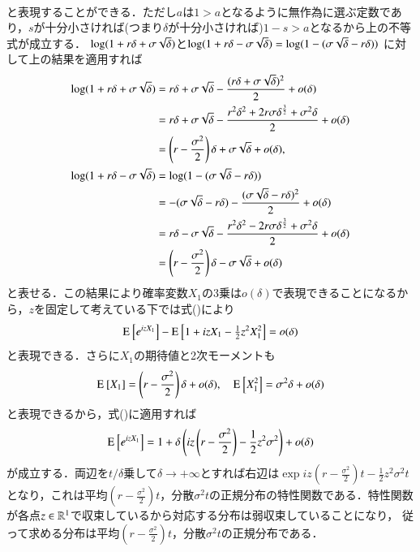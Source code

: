 \begin{description}
\begin{align}
		\end{align}
		と表現することができる．ただし$a$は$1 > a$となるように無作為に選ぶ定数であり，$s$が十分小さければ(つまり$\delta$が十分小さければ)$1 - s > a$となるから上の不等式が成立する．
		$\operatorname{log} (1 + r \delta + \sigma \sqrt{\delta})$と$\operatorname{log} (1 + r \delta - \sigma \sqrt{\delta}) = \operatorname{log} (1 - (\sigma \sqrt{\delta} - r \delta))$
		に対して上の結果を適用すれば
		\begin{align}
			\operatorname{log} (1 + r \delta + \sigma \sqrt{\delta}) &= r \delta + \sigma \sqrt{\delta} - \frac{(r \delta + \sigma \sqrt{\delta})^2}{2} + o(\delta) \\
				&= r \delta + \sigma \sqrt{\delta} - \frac{r^2 \delta^2 + 2r \sigma \delta^\frac{3}{2} + \sigma^2 \delta}{2} + o(\delta) \\
				&= \left(r - \frac{\sigma^2}{2}\right)\delta + \sigma \sqrt{\delta} + o(\delta), \\
			\operatorname{log} (1 + r \delta - \sigma \sqrt{\delta}) &= \operatorname{log} (1 - (\sigma \sqrt{\delta} - r \delta)) \\
				&= - (\sigma \sqrt{\delta} - r \delta) - \frac{(\sigma \sqrt{\delta} - r \delta)^2}{2} + o(\delta) \\
				&= r \delta - \sigma \sqrt{\delta} - \frac{r^2 \delta^2 - 2r \sigma \delta^\frac{3}{2} + \sigma^2 \delta}{2} + o(\delta) \\
				&= \left(r - \frac{\sigma^2}{2}\right)\delta - \sigma \sqrt{\delta} + o(\delta)
		\end{align}
		と表せる．この結果により確率変数$X_1$の3乗は$o(\delta)$で表現できることになるから，$z$を固定して考えている下では式()により
		\begin{align}
			\operatorname{E}_{}^{} \left[ e^{izX_1} \right] - \operatorname{E}_{}^{} \left[ 1 + izX_1 - \tfrac{1}{2}z^2X_1^2 \right] = o(\delta) \label{eq:finance_Q2_2}
		\end{align}
		と表現できる．さらに$X_1$の期待値と2次モーメントも
		\begin{align}
			\operatorname{E}_{}^{} \left[ X_1 \right] = \left(r - \frac{\sigma^2}{2}\right)\delta + o(\delta), \quad \operatorname{E}_{}^{} \left[ X_1^2 \right] = \sigma^2 \delta + o(\delta)
		\end{align}
		と表現できるから，式()に適用すれば
		\begin{align}
			\operatorname{E}_{}^{} \left[ e^{izX_1} \right] = 1 + \delta \left(iz\left(r - \frac{\sigma^2}{2}\right) - \frac{1}{2}z^2 \sigma^2 \right) + o(\delta)
		\end{align}
		が成立する．両辺を$t/\delta$乗して$\delta \longrightarrow +\infty$とすれば右辺は$\exp{iz\left(r - \frac{\sigma^2}{2}\right)t - \frac{1}{2}z^2 \sigma^2t}$
		となり，これは平均$\left(r - \frac{\sigma^2}{2}\right)t$，分散$\sigma^2t$の正規分布の特性関数である．特性関数が各点$z \in \mathbb{R}^1$で収束しているから対応する分布は弱収束していることになり，
		従って求める分布は平均$\left(r - \frac{\sigma^2}{2}\right)t$，分散$\sigma^2t$の正規分布である．
		\QED
\end{description}

